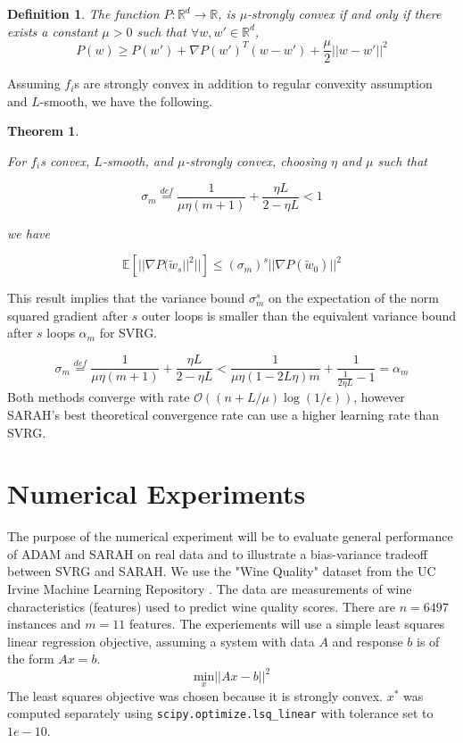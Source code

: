 \documentclass[letterpaper,11 pt]{article}
\newtheorem{theorem}{Theorem}
\newtheorem{definition}{Definition}
\begin{document}
\begin{definition}\label{def:sconvex}
The function $P:\mathbb{R}^{d} \rightarrow \mathbb{R}$, is $\mu$-strongly convex if and only if there exists a constant $\mu > 0$ such that $\forall w,w' \in \mathbb{R}^{d}$,
\[
P(w) \geq P(w') + \nabla P(w')^{T} (w-w') + \frac{\mu}{2} ||w - w' ||^{2}
\]
\end{definition}

Assuming $f_{i}$s are strongly convex in addition to regular convexity assumption and $L$-smooth, we have the following.

\begin{theorem}\label{thm:sarvar}

For $f_{i}$s convex, $L$-smooth, and $\mu$-strongly convex, choosing $\eta$ and $\mu$ such that

\begin{equation}\label{eq:sarvar}
\sigma_{m}\stackrel{def}{=}\frac{1}{\mu\eta(m+1)}+\frac{\eta L}{2-\eta L}<1
\end{equation}

we have

\[
\mathbb{E}[||\nabla P(\tilde{w}_{s}||^{2}||] \leq  (\sigma_{m})^{s} || \nabla P ( \tilde{w}_{0} ) ||^{2}
\]

\end{theorem}

This result implies that the variance bound $\sigma_{m}^{s}$ on the expectation of the norm squared gradient after $s$ outer loops is smaller than the equivalent variance bound after $s$ loops $\alpha_{m}$ for SVRG.

\[
\sigma_{m}\stackrel{def}{=}\frac{1}{\mu\eta(m+1)}+\frac{\eta L}{2-\eta L}  <  \frac{1}{\mu\eta(1-2L\eta)m}+\frac{1}{\frac{1}{2\eta L}-1}=\alpha_{m}
\]
Both methods converge with rate $\mathcal{O}((n+L/\mu)\log(1/\epsilon))$, however SARAH's best theoretical convergence rate can use a higher learning rate than SVRG.

\section{Numerical Experiments}\label{sec:num}

The purpose of the numerical experiment will be to evaluate general performance of ADAM and SARAH on real data and to illustrate a bias-variance tradeoff between SVRG and SARAH.
We use the "Wine Quality" dataset from the UC Irvine Machine Learning Repository \cite{winequality}. The data are measurements of wine characteristics (features) used to predict wine quality scores. There are $n=6497$ instances and $m=11$ features. The experiements will use a simple least squares linear regression objective, assuming a system with data $A$ and response $b$ is of the form $Ax=b$.
\[
\underset{x}{\text{min}}||Ax-b||^{2}
\]
The least squares objective was chosen because it is strongly convex.  $x^*$ was computed separately using \verb|scipy.optimize.lsq_linear| with tolerance set to $1e-10$.  
\end{document}
